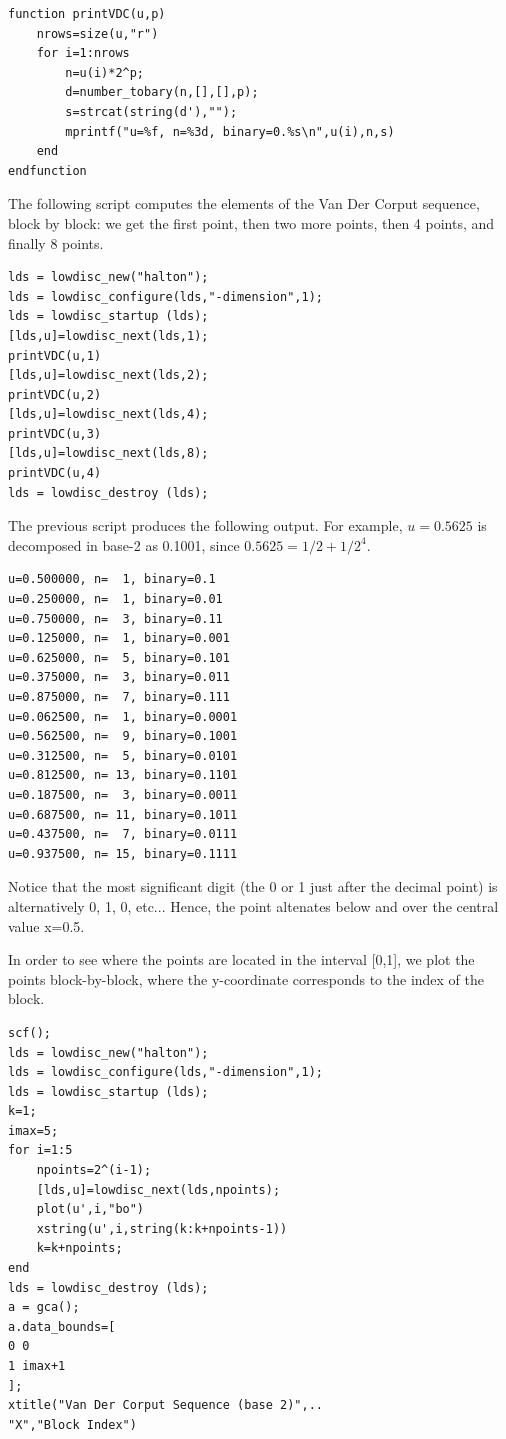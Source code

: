 \lstset{language=scilabscript}
\begin{lstlisting}
function printVDC(u,p)
    nrows=size(u,"r")
    for i=1:nrows
        n=u(i)*2^p;
        d=number_tobary(n,[],[],p);
        s=strcat(string(d'),"");
        mprintf("u=%f, n=%3d, binary=0.%s\n",u(i),n,s)
    end
endfunction
\end{lstlisting}

    
      The following script computes the elements of the Van Der Corput 
	  sequence, block by block: 
	  we get the first point, then two more points, then 4 points, 
	  and finally 8 points.
    

\lstset{language=scilabscript}
\begin{lstlisting}
lds = lowdisc_new("halton");
lds = lowdisc_configure(lds,"-dimension",1);
lds = lowdisc_startup (lds);
[lds,u]=lowdisc_next(lds,1);
printVDC(u,1)
[lds,u]=lowdisc_next(lds,2);
printVDC(u,2)
[lds,u]=lowdisc_next(lds,4);
printVDC(u,3)
[lds,u]=lowdisc_next(lds,8);
printVDC(u,4)
lds = lowdisc_destroy (lds);
\end{lstlisting}

    
      The previous script produces the following output.
	  For example, $u=0.5625$ is decomposed in base-2 as 0.1001, 
	  since $0.5625=1/2+1/2^4$.
    

\lstset{language=scilabscript}
\begin{lstlisting}
u=0.500000, n=  1, binary=0.1
u=0.250000, n=  1, binary=0.01
u=0.750000, n=  3, binary=0.11
u=0.125000, n=  1, binary=0.001
u=0.625000, n=  5, binary=0.101
u=0.375000, n=  3, binary=0.011
u=0.875000, n=  7, binary=0.111
u=0.062500, n=  1, binary=0.0001
u=0.562500, n=  9, binary=0.1001
u=0.312500, n=  5, binary=0.0101
u=0.812500, n= 13, binary=0.1101
u=0.187500, n=  3, binary=0.0011
u=0.687500, n= 11, binary=0.1011
u=0.437500, n=  7, binary=0.0111
u=0.937500, n= 15, binary=0.1111
\end{lstlisting}

    
      Notice that the most significant digit (the 0 or 1 just after the 
	  decimal point) is alternatively 0, 1, 0, etc... 
	  Hence, the point altenates below and over the central value x=0.5.
    

    
      In order to see where the points are located in the interval [0,1], 
	  we plot the points block-by-block, where the y-coordinate corresponds 
	  to the index of the block.
    
	
\lstset{language=scilabscript}
\begin{lstlisting}
scf();
lds = lowdisc_new("halton");
lds = lowdisc_configure(lds,"-dimension",1);
lds = lowdisc_startup (lds);
k=1;
imax=5;
for i=1:5
    npoints=2^(i-1);
    [lds,u]=lowdisc_next(lds,npoints);
    plot(u',i,"bo")
    xstring(u',i,string(k:k+npoints-1))
    k=k+npoints;
end
lds = lowdisc_destroy (lds);
a = gca();
a.data_bounds=[
0 0
1 imax+1
];
xtitle("Van Der Corput Sequence (base 2)",..
"X","Block Index")
\end{lstlisting}

